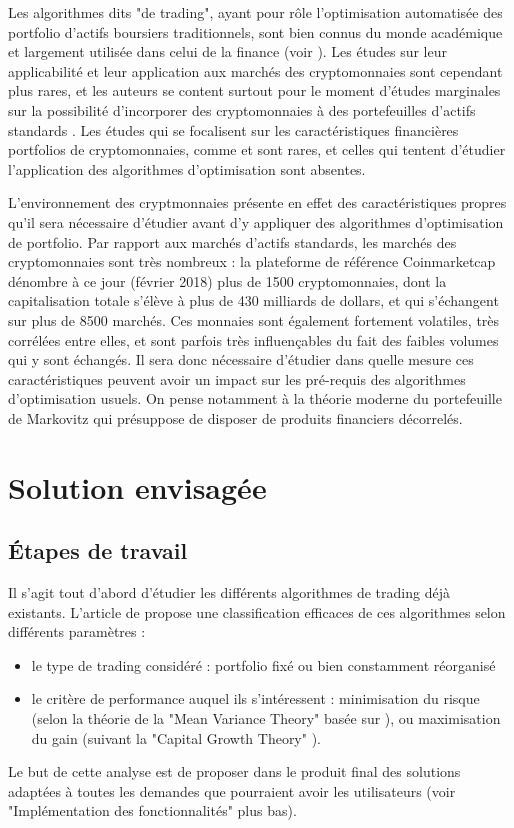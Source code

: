 \documentclass[a4paper]{article}
\begin{document}
Les algorithmes dits "de trading", ayant pour rôle l'optimisation automatisée des portfolio d'actifs boursiers traditionnels, sont bien connus du monde académique et largement utilisée dans celui de la finance (voir \cite{Li2014}). Les études sur leur applicabilité et leur application aux marchés des cryptomonnaies sont cependant plus rares, et les auteurs se content surtout pour le moment d'études marginales sur la possibilité d'incorporer des cryptomonnaies à des portefeuilles d'actifs standards \cite{Elendner2018}. Les études qui se focalisent sur les caractéristiques financières portfolios de cryptomonnaies, comme \cite{KuoChuen17} et \cite{Chen2018} sont rares, et celles qui tentent d'étudier l'application des algorithmes d'optimisation sont absentes.

L'environnement des cryptmonnaies présente en effet des caractéristiques propres qu'il sera nécessaire d'étudier avant d'y appliquer des algorithmes d'optimisation de portfolio. Par rapport aux marchés d'actifs standards, les marchés des cryptomonnaies sont très nombreux : la plateforme de référence Coinmarketcap dénombre à ce jour (février 2018) plus de 1500 cryptomonnaies, dont la capitalisation totale s'élève à plus de 430 milliards de dollars, et qui s'échangent sur plus de 8500 marchés. Ces monnaies sont également fortement volatiles, très corrélées entre elles, et sont parfois très influençables du fait des faibles volumes qui y sont échangés. Il sera donc nécessaire d'étudier dans quelle mesure ces caractéristiques peuvent avoir un impact sur les pré-requis des algorithmes d'optimisation usuels. On pense notamment à la théorie moderne du portefeuille de Markovitz qui présuppose de disposer de produits financiers décorrelés.

\section{Solution envisagée}

\subsection{Étapes de travail}

Il s'agit tout d'abord d'étudier les différents algorithmes de trading déjà existants. L'article de \citet{Li2014} propose une classification efficaces de ces algorithmes selon différents paramètres :
\begin{itemize}
    \item le type de trading considéré : portfolio fixé ou bien constamment réorganisé
    \item le critère de performance auquel ils s'intéressent : minimisation du risque (selon la théorie de la "Mean Variance Theory" basée sur \citet{Markovitz1952}), ou maximisation du gain (suivant la "Capital Growth Theory" \cite{Hakansson2011}).
\end{itemize}
Le but de cette analyse est de proposer dans le produit final des solutions adaptées à toutes les demandes que pourraient avoir les utilisateurs (voir "Implémentation des fonctionnalités" plus bas).
\end{document}
